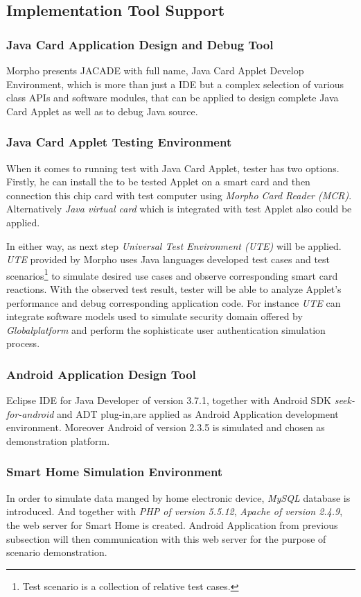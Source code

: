 \subsection{Implementation Tool Support}
\subsubsection{Java Card Application Design and Debug Tool}
Morpho presents JACADE with full name, Java Card Applet Develop Environment, which is more than just a IDE but a complex selection of various class APIs and software modules, that can be applied to design complete Java Card Applet as well as to debug Java source. 
\subsubsection{Java Card Applet Testing Environment}
When it comes to running test with Java Card Applet, tester has two options. Firstly, he can install the to be tested Applet on a smart card and then connection this chip card with test computer using \emph{Morpho Card Reader (MCR)}. Alternatively \emph{Java virtual card} which is integrated with test Applet also could be applied. 

In either way, as next step \emph{Universal Test Environment (UTE)} will be applied. \emph{UTE} provided by Morpho uses Java languages developed test cases
 and test scenarios\footnote{Test scenario is a collection of relative test cases.} to simulate desired use cases and observe corresponding smart card reactions. With the observed test result, tester will be able to analyze Applet's performance and debug corresponding application code. For instance \emph{UTE} can integrate software models used to simulate security domain offered by \emph{Globalplatform} and perform the sophisticate user authentication simulation process.
\subsubsection{Android Application Design Tool}
Eclipse IDE for Java Developer of version 3.7.1, together with Android SDK \emph{seek-for-android} and ADT plug-in,are applied as Android Application development environment. Moreover Android of version 2.3.5 is simulated and chosen as demonstration platform.
\subsubsection{Smart Home Simulation Environment}
In order to simulate data manged by home electronic device, \emph{MySQL} database is introduced. And together with \emph{PHP of version 5.5.12}, \emph{Apache of version 2.4.9}, the web server for Smart Home is created. Android Application from previous subsection will then communication with this web server for the purpose of scenario demonstration.